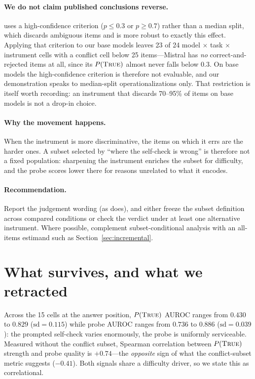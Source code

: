 \documentclass[10pt]{article}
\newcommand{\ptrue}{P(\textsc{True})}
\begin{document}
\paragraph{We do not claim published conclusions reverse.} \citet{diagnosing2026} uses a
high-confidence criterion ($p \le 0.3$ or $p \ge 0.7$) rather than a median split, which discards
ambiguous items and is more robust to exactly this effect. Applying that criterion to our base
models leaves 23 of 24 model $\times$ task $\times$ instrument cells with a conflict cell below 25
items---Mistral has \emph{no} correct-and-rejected items at all, since its $\ptrue{}$ almost never
falls below $0.3$. On base models the high-confidence criterion is therefore not evaluable, and our
demonstration speaks to median-split operationalizations only. That restriction is itself worth
recording: an instrument that discards 70--95\% of items on base models is not a drop-in choice.

\paragraph{Why the movement happens.} When the instrument is more discriminative, the items on which
it errs are the harder ones. A subset selected by ``where the self-check is wrong'' is therefore not
a fixed population: sharpening the instrument enriches the subset for difficulty, and the probe
scores lower there for reasons unrelated to what it encodes.

\paragraph{Recommendation.} Report the judgement wording (as \citet{diagnosing2026} does), and
either freeze the subset definition across compared conditions or check the verdict under at least
one alternative instrument. Where possible, complement subset-conditional analysis with an
all-items estimand such as Section~\ref{sec:incremental}.

\section{What survives, and what we retracted}
\label{sec:retractions}

Across the 15 cells at the answer position, $\ptrue{}$ AUROC ranges from $0.430$ to $0.829$
($\mathrm{sd}=0.115$) while probe AUROC ranges from $0.736$ to $0.886$ ($\mathrm{sd}=0.039$): the
prompted self-check varies enormously, the probe is uniformly serviceable. Measured without the
conflict subset, Spearman correlation between $\ptrue{}$ strength and probe quality is $+0.74$---the
\emph{opposite} sign of what the conflict-subset metric suggests ($-0.41$). Both signals share a
difficulty driver, so we state this as correlational.
\end{document}
